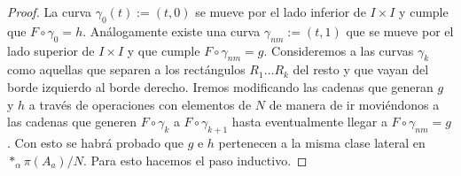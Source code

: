 \begin{proof}
  La curva \(\gamma_0 (t) := (t, 0)\) se mueve por el lado inferior de
  \(I \times I\) y cumple que \(F \circ \gamma_0 = h \). Análogamente
  existe una curva \(\gamma_{nm} := (t,1)\) que se mueve por el lado
  superior de \(I \times I\) y que cumple \(F \circ \gamma_{nm} = g\).
  Consideremos a las curvas \(\gamma_k\) como aquellas que separen a los
  rectángulos \(R_1 \dots R_k\) del resto y que vayan del borde
  izquierdo al borde derecho. Iremos modificando las cadenas que generan
  \(g\) y \(h\) a través de operaciones con elementos de \(N\) de manera
  de ir moviéndonos a las cadenas que generen \(F \circ \gamma_{k}\) a
  \(F \circ \gamma_{k+1}\) hasta eventualmente llegar a \(F \circ
  \gamma_{nm} = g\). Con esto se habrá probado que \(g\) e \(h\)
  pertenecen a la misma clase lateral en \(*_\alpha \pi (A_a) / N\).
  Para esto hacemos el paso inductivo.
\end{proof}
